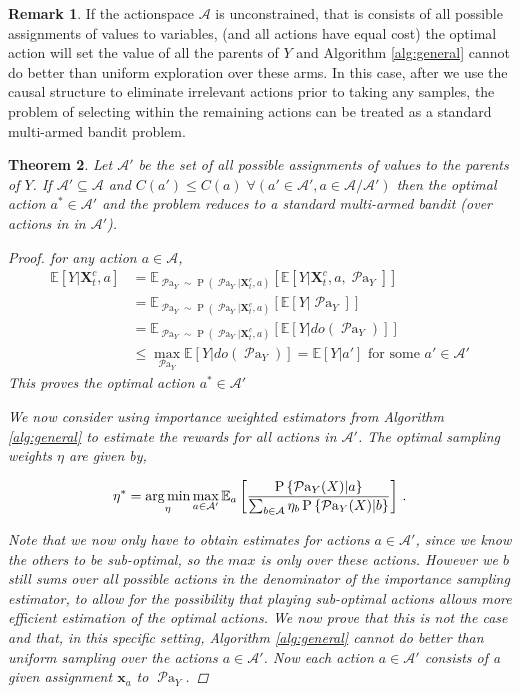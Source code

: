 \documentclass[11pt,a4paper,twoside]{report}
\newcommand{\EE}{\mathbb E}
\newcommand{\EEa}{\EE_a}
\newcommand{\Pn}[2]{\operatorname{P}\left\{#2|#1\right\}}
\newcommand{\calA}{\mathcal A}
\newcommand{\Esub}[2]{\mathbb E_{#1}\left[{#2}\right]}
\newcommand{\E}[1]{\mathbb E\left[{#1}\right]}
\newcommand{\argmin}{\operatornamewithlimits{arg\,min}}
\newcommand{\eq}[1]{\begin{align*}#1\end{align*}}
\renewcommand{\P}[1]{\operatorname{P}\left(#1\right)}
\newcommand{\parents}[1]{\operatorname{\mathcal{P}a}_{#1}}
\renewcommand{\vec}[1]{\boldsymbol{#1}}
\theoremstyle{plain}
\newtheorem{theorem}{Theorem}
\theoremstyle{definition}
\newtheorem{remark}[theorem]{Remark}
\begin{document}
\begin{remark} If the actionspace $\mathcal{A}$ is unconstrained, that is consists of all possible assignments of values to variables, (and all actions have equal cost) the optimal action will set the value of all the parents of $Y$ and Algorithm \ref{alg:general} cannot do better than uniform exploration over these arms. In this case, after we use the causal structure to eliminate irrelevant actions prior to taking any samples, the problem of selecting within the remaining actions can be treated as a standard multi-armed bandit problem. 
\end{remark} 

\vspace{0.5cm}
\begin{theorem}
\label{theorem:cb-intervene-all-parents}
Let $\mathcal{A'}$ be the set of all possible assignments of values to the parents of $Y$. If $\mathcal{A'} \subseteq \mathcal{A}$ and $C(a') \leq C(a) \; \forall (a' \in \mathcal{A'}, a \in \mathcal{A}/\mathcal{A'})$ then the optimal action $a^* \in \mathcal{A'}$ and the problem reduces to a standard multi-armed bandit (over actions in in $\mathcal{A'}$).
\begin{proof}
for any action $a \in \mathcal{A}$, 
\eq{
 \E{Y|\vec{X}^c_t,a} &= \Esub{\parents{Y}\sim \P{\parents{Y}|\vec{X}^c_t,a}}{\E{Y|\vec{X}^c_t,a,\parents{Y}}} \\
 &= \Esub{\parents{Y}\sim \P{\parents{Y}|\vec{X}^c_t,a}}{\E{Y|\parents{Y}}}\\
 &= \Esub{\parents{Y}\sim \P{\parents{Y}|\vec{X}^c_t,a}}{\E{Y|do(\parents{Y})}}\\
 &\leq \max_{\parents{Y}}\E{Y|do(\parents{Y})} = \E{Y|a'} \text{ for some $a' \in \mathcal{A'}$}
}
This proves the optimal action $a^* \in \mathcal{A'}$

We now consider using importance weighted estimators from Algorithm \ref{alg:general} to estimate the rewards for all actions in $ \mathcal{A'}$. The optimal sampling weights $\eta$ are given by,

\eq{
\eta^*  = \argmin_\eta \max_{a \in \mathcal{A'}} \EEa \left[\frac{\Pn{a}{\parents{Y}(X)}}{\sum_{b \in \calA} \eta_b \Pn{b}{\parents{Y}(X)}}\right]\,.
}

Note that we now only have to obtain estimates for actions $a \in \mathcal{A'}$, since we know the others to be sub-optimal, so the $max$ is only over these actions. However we $b$ still sums over all possible actions in the denominator of the importance sampling estimator, to allow for the possibility that playing sub-optimal actions allows more efficient estimation of the optimal actions. We now prove that this is not the case and that, in this specific setting, Algorithm \ref{alg:general} cannot do better than uniform sampling over the actions $a \in \mathcal{A'}$. Now each action $a \in \mathcal{A'}$ consists of a given assignment $\vec{x}_a$ to $\parents{Y}$.


\end{proof}
\end{theorem}
\end{document}
